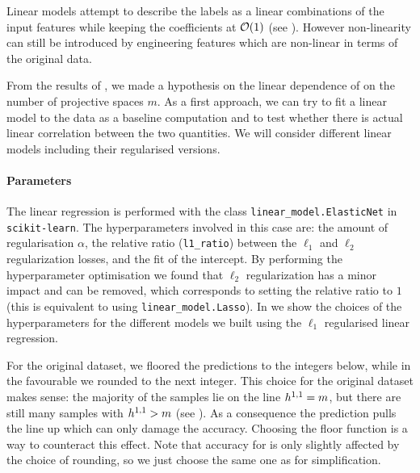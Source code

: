 Linear models attempt to describe the labels as a linear combinations of the input features while keeping the coefficients at $\order{1}$ (see ).
However non-linearity can still be introduced by engineering features which are non-linear in terms of the original data.\footnotemark{}

From the results of , we made a hypothesis on the linear dependence of  on the number of projective spaces $m$.
As a first approach, we can try to fit a linear model to the data as a baseline computation and to test whether there is actual linear correlation between the two quantities.
We will consider different linear models including their regularised versions.


\paragraph{Parameters}

The linear regression is performed with the class \texttt{linear\_model.ElasticNet} in \texttt{scikit-learn}.
The hyperparameters involved in this case are: the amount of regularisation $\alpha$, the relative ratio (\texttt{l1\_ratio}) between the $\ell_1$ and $\ell_2$ regularization losses, and the fit of the intercept.
By performing the hyperparameter optimisation we found that $\ell_2$ regularization has a minor impact and can be removed, which corresponds to setting the relative ratio to $1$ (this is equivalent to using \texttt{linear\_model.Lasso}).
In  we show the choices of the hyperparameters for the different models we built using the $\ell_1$ regularised linear regression.

For the original dataset, we floored the predictions to the integers below, while in the favourable we rounded to the next integer.
This choice for the original dataset makes sense: the majority of the samples lie on the line $h^{1,1} = m$, but there are still many samples with $h^{1,1} > m$ (see ).
As a consequence the \ml prediction pulls the line up which can only damage the accuracy.
Choosing the floor function is a way to counteract this effect.
Note that accuracy for  is only slightly affected by the choice of rounding, so we just choose the same one as  for simplification.


